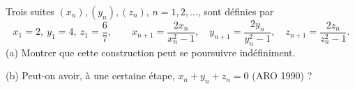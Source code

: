 Trois suites $(x_n), (y_n), (z_n)$, $n = 1, 2, \ldots$, sont définies par
\[ x_1 = 2,\ y_1 = 4,\ z_1 = \frac{6}{7},\qquad x_{n+1} = \frac{2x_n}{x_n^2 - 1},\quad y_{n+1} = \frac{2y_n}{y_n^2 - 1},\quad z_{n+1} = \frac{2z_n}{z_n^2 - 1}. \]
(a) Montrer que cette construction peut se poursuivre indéfiniment.

(b) Peut-on avoir, à une certaine étape, $x_n + y_n + z_n = 0$ (ARO 1990) ?

